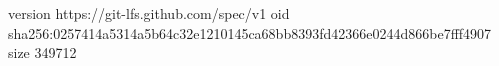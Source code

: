 version https://git-lfs.github.com/spec/v1
oid sha256:0257414a5314a5b64c32e1210145ca68bb8393fd42366e0244d866be7fff4907
size 349712
